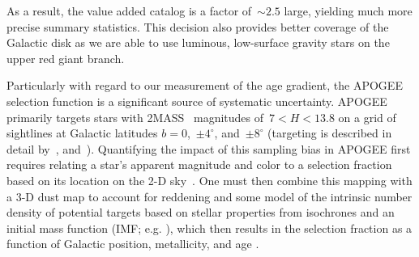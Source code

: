 As a result, the value added catalog is a factor of~$\sim$$2.5$ large, yielding
much more precise summary statistics.
This decision also provides better coverage of the Galactic disk as we are able
to use luminous, low-surface gravity stars on the upper red giant branch.
\par
Particularly with regard to our measurement of the age gradient, the APOGEE
selection function is a significant source of systematic uncertainty.
APOGEE primarily targets stars with 2MASS~\citep{Skrutskie2006} magnitudes
of~$7 < H < 13.8$ on a grid of sightlines at Galactic latitudes
$b = 0$,~$\pm 4^\circ$, and~$\pm 8^\circ$ (targeting is described in detail
by~\citealt{Zasowski2013, Zasowski2017, Beaton2021}, and~\citealt{Santana2021}).
Quantifying the impact of this sampling bias in APOGEE first requires relating
a star's apparent magnitude and color to a selection fraction based on its
location on the 2-D sky~\citep{Bovy2016c, Mackereth2017, Lian2022}.
One must then combine this mapping with a 3-D dust map to account for reddening
and some model of the intrinsic number density of potential targets based on
stellar properties from isochrones and an initial mass function (IMF; e.g.
\citealt{Kroupa2001, Chabrier2003}), which then results in the selection
fraction as a function of Galactic position, metallicity, and age
\citep[see also][]{Mackereth2020}.



% 


